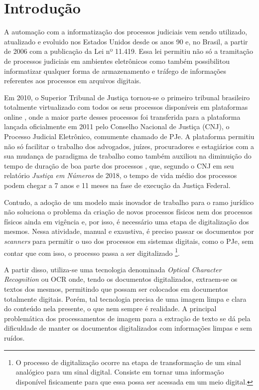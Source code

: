 \chapter[Introdução]{Introdução}

A automação com a informatização dos processos judiciais vem sendo utilizado, atualizado e evoluido nos Estados Unidos desde os anos 90 \cite{automating-judicial-doc} e, no Brasil, a partir de 2006 com a publicação da Lei nº 11.419. Essa lei permitiu não só a tramitação de processos judiciais em ambientes eletrônicos \cite{digitalizacao-de-proc-judiciais} como também possibilitou informatizar qualquer forma de armazenamento e tráfego de informações referentes aos processos em arquivos digitais.

Em 2010, o Superior Tribunal de Justiça tornou-se o primeiro tribunal brasileiro totalmente virtualizado com todos os seus processos disponíveis em plataformas online \cite{digitalizacao-de-proc-judiciais}, onde a maior parte desses processos foi transferida para a plataforma lançada oficialmente em 2011 pelo Conselho Nacional de Justiça (CNJ), o Processo Judicial Eletrônico, comumente chamado de PJe. A plataforma permitiu não só facilitar o trabalho dos advogados, juízes, procuradores e estagiários com a sua mudança de paradigma de trabalho como também auxiliou na diminuição do tempo de duração de boa parte dos processos \cite{pje-diminuicao-tempo-do=proc}, que, segundo o CNJ em seu relatório \textit{Justiça em Números} de 2018, o tempo de vida médio dos processos podem chegar a 7 anos e 11 meses na fase de execução da Justiça Federal.

Contudo, a adoção de um modelo mais inovador de trabalho para o ramo jurídico não soluciona o problema da criação de novos processos físicos nem dos processos físicos ainda em vigência e, por isso, é necessário uma etapa de digitalização dos mesmos. Nessa atividade, manual e exaustiva, é preciso passar os documentos por \textit{scanners} para permitir o uso dos processos em sistemas digitais, como o PJe, sem contar que com isso, o processo passa a ser digitalizado
    \footnote{
        O processo de digitalização ocorre na etapa de transformação de um sinal analógico para um sinal digital. Consiste em tornar uma informação disponível fisicamente para que essa possa ser acessada em um meio digital.
    }.

A partir disso, utiliza-se uma tecnologia denominada \textit{Optical Character Recognition} ou OCR onde, tendo os documentos digitalizados, extraem-se os textos dos mesmos, permitindo que possam ser colocados em documentos totalmente digitais. Porém, tal tecnologia precisa de uma imagem limpa e clara do conteúdo nela presente, o que nem sempre é realidade. A principal problemática dos processamentos de imagem para a extração de texto se dá pela dificuldade de manter os documentos digitalizados com informações limpas e sem ruídos.

